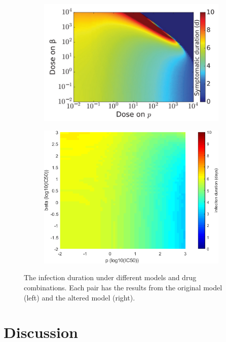 \documentclass[a4paper,11pt]{article}
\begin{document}
\begin{figure}[H]
\begin{subfigure}{0.4\textwidth}
    \includegraphics[width=\textwidth]{MBetaPT.png}
    \end{subfigure}
    \begin{subfigure}{0.35\textwidth}

    \includegraphics[width=\textwidth]{BetaP_times.png}
    \end{subfigure}

     \caption{\small The infection duration under different models and drug combinations. Each pair has the results from the original model (left) and the altered model (right).}
    \label{fig:my_label}

    \end{figure}


\newpage

\section*{Discussion}
\end{document}
